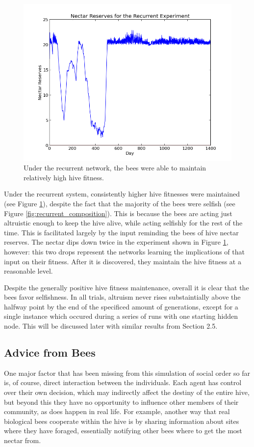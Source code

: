 \documentclass[twoside]{article}
\begin{document}
\begin{multicols}{2}
			\begin{figure}[H]
				\begin{center}
					\includegraphics[width=.5\textwidth]{results/recurrent_res.png}
				\end{center}
				\caption{Under the recurrent network, the bees were able to maintain relatively high hive fitness.}
				\label{fig:recurrent_reserves}
			\end{figure}

			Under the recurrent system, consistently higher hive fitnesses were maintained (see Figure \ref{fig:recurrent_reserves}), despite the fact that the majority of the bees were selfish (see Figure \ref{fig:recurrent_composition}). This is because the bees are acting just altruistic enough to keep the hive alive, while acting selfishly for the rest of the time. This is facilitated largely by the input reminding the bees of hive nectar reserves. The nectar dips down twice in the experiment shown in Figure \ref{fig:recurrent_reserves}, however: this two drops represent the networks learning the implications of that input on their fitness. After it is discovered, they maintain the hive fitness at a reasonable level.
            
            Despite the generally positive hive fitness maintenance, overall it is clear that the bees favor selfishness. In all trials, altruism never rises substaintially above the halfway point by the end of the specificed amount of generations, except for a single instance which occured during a series of runs with one starting hidden node. This will be discussed later with similar results from Section 2.5.


		\subsection{Advice from Bees} %
		\label{sub:advice_from_bees}

			One major factor that has been missing from this simulation of social order so far is, of course, direct interaction between the individuals. Each agent has control over their own decision, which may indirectly affect the destiny of the entire hive, but beyond this they have no opportunity to influence other members of their community, as does happen in real life. For example, another way that real biological bees cooperate within the hive is by sharing information about sites where they have foraged, essentially notifying other bees where to get the most nectar from. 


\end{multicols}
\end{document}
